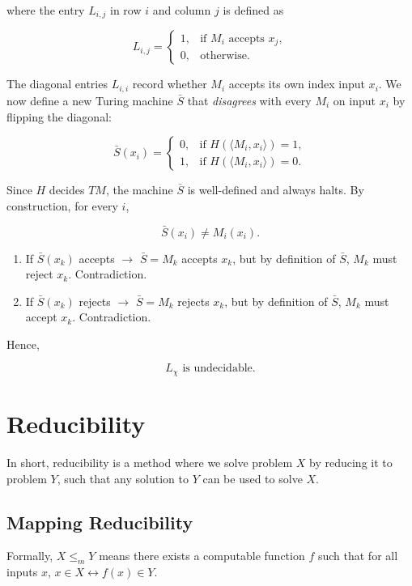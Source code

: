 \documentclass[12pt,a4paper,openany]{article}
\begin{document}
where the entry $L_{i,j}$ in row $i$ and column $j$ is defined as

\[
L_{i,j} =
\begin{cases}
1, & \text{if } M_i \text{ accepts } x_j, \\
0, & \text{otherwise}.
\end{cases}
\]

The diagonal entries $L_{i,i}$ record whether $M_i$ accepts its
own index input $x_i$. We now define a new Turing machine $\bar{S}$ that
\emph{disagrees} with every $M_i$ on input $x_i$ by flipping the diagonal:

\[
\bar{S}(x_i) =
\begin{cases}
0, & \text{if } H(\langle M_i, x_i \rangle) = 1, \\  
1, & \text{if } H(\langle M_i, x_i \rangle) = 0. 
\end{cases}
\]

Since $H$ decides $TM$, the machine $\bar{S}$ is well-defined and always halts.
By construction, for every $i$,

\[
\bar{S}(x_i) \neq M_i(x_i).
\]

\begin{enumerate}
    \item If $\bar{S}(x_k)$ accepts $\to$ $\bar{S} = M_k$ accepts $x_k$, 
    but by definition of $\bar{S}$, $M_k$ must reject $x_k$. Contradiction.
    \item If $\bar{S}(x_k)$ rejects $\to$ $\bar{S} = M_k$ rejects $x_k$, 
    but by definition of $\bar{S}$, $M_k$ must accept $x_k$. Contradiction.
\end{enumerate}

Hence,

\[
\boxed{L_{\chi} \text{ is undecidable}.}
\]

\section{Reducibility}

In short, reducibility is a method where we solve problem $X$ by reducing it to problem $Y$, such that any solution to $Y$ can be used to solve $X$. 



\subsection{Mapping Reducibility}

Formally, $X \leq_m Y$ means there exists a computable function $f$ such that for all inputs $x$, $x \in X \leftrightarrow f(x) \in Y$.
\end{document}

